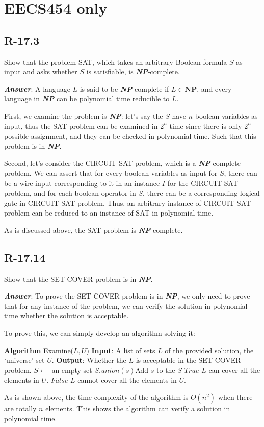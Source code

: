 \documentclass[11pt]{article}
\begin{document}
\section{EECS454 only}
\subsection{R-17.3}
Show that the problem SAT, which takes an arbitrary Boolean formula $S$ as input and asks whether $S$ is satisfiable, is \textbf{\emph{NP}}-complete.

\noindent \textbf{\emph{Answer}}: A language $L$ is said to be \textbf{\emph{NP}}-complete if $L\in \textbf{NP}$, and every language in \textbf{\emph{NP}} can be polynomial time reducible to $L$. 

First, we examine the problem is \textbf{\emph{NP}}: let's say the $S$ have $n$ boolean variables as input, thus the SAT problem can be examined in $2^n$ time since there is only $2^n$ possible assignment, and they can be checked in polynomial time. Such that this problem is in \textbf{\emph{NP}}.

Second, let's consider the CIRCUIT-SAT problem, which is a \textbf{\emph{NP}}-complete problem. We can assert that for every boolean variables as input for $S$, there can be a wire input corresponding to it in an instance $I$ for the CIRCUIT-SAT problem, and for each boolean operator in $S$, there can be a corresponding logical gate in CIRCUIT-SAT problem. Thus, an arbitrary instance of CIRCUIT-SAT problem can be reduced to an instance of SAT in polynomial time. 

As is discussed above, the SAT problem is \textbf{\emph{NP}}-complete.

\subsection{R-17.14}
Show that the SET-COVER problem is in \textbf{\emph{NP}}.

\noindent \textbf{\emph{Answer}}: To prove the SET-COVER problem is in \textbf{\emph{NP}}, we only need to prove that for any instance of the problem, we can verify the solution in polynomial time whether the solution is acceptable.

To prove this, we can simply develop an algorithm solving it:
\begin{algorithmic}
	\State \textbf{Algorithm} Examine($L,U$)
	\State \textbf{Input}: A list of sets $L$ of the provided solution, the `universe' set $U$.
	\State \textbf{Output}: Whether the $L$ is acceptable in the SET-COVER problem.
	\State $S\gets$ an empty set
		\State $S.union(s)$\Comment Add $s$ to the $S$
	\EndFor
		\State \Return $True$ \Comment $L$ can cover all the elements in $U$.
	\Else
		\State \Return $False$ \Comment $L$ cannot cover all the elements in $U$.
	\EndIf
\end{algorithmic}

As is shown above, the time complexity of the algorithm is $O(n^2)$ when there are totally $n$ elements. This shows the algorithm can verify a solution in polynomial time.
\end{document}
